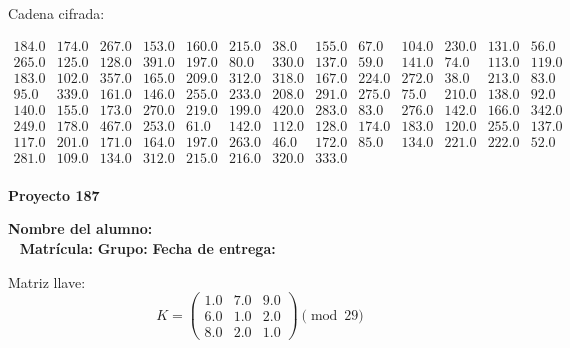 \documentclass[12pt]{article}
\begin{document}
Cadena cifrada:
\begin{center}
$\begin{array}{lllllllllllll}
184.0 & 174.0 & 267.0 & 153.0 & 160.0 & 215.0 & 38.0 & 155.0 & 67.0 & 104.0 & 230.0 & 131.0 & 56.0\\
265.0 & 125.0 & 128.0 & 391.0 & 197.0 & 80.0 & 330.0 & 137.0 & 59.0 & 141.0 & 74.0 & 113.0 & 119.0\\
183.0 & 102.0 & 357.0 & 165.0 & 209.0 & 312.0 & 318.0 & 167.0 & 224.0 & 272.0 & 38.0 & 213.0 & 83.0\\
95.0 & 339.0 & 161.0 & 146.0 & 255.0 & 233.0 & 208.0 & 291.0 & 275.0 & 75.0 & 210.0 & 138.0 & 92.0\\
140.0 & 155.0 & 173.0 & 270.0 & 219.0 & 199.0 & 420.0 & 283.0 & 83.0 & 276.0 & 142.0 & 166.0 & 342.0\\
249.0 & 178.0 & 467.0 & 253.0 & 61.0 & 142.0 & 112.0 & 128.0 & 174.0 & 183.0 & 120.0 & 255.0 & 137.0\\
117.0 & 201.0 & 171.0 & 164.0 & 197.0 & 263.0 & 46.0 & 172.0 & 85.0 & 134.0 & 221.0 & 222.0 & 52.0\\
281.0 & 109.0 & 134.0 & 312.0 & 215.0 & 216.0 & 320.0 & 333.0\\
\end{array}$
\end{center}

\newpage


\textbf{Proyecto 187}

\textbf{Nombre del alumno:} \underline{\hspace{13cm}}\\\
\vspace{1cm}
\textbf{Matrícula:} \underline{\hspace{4cm}} \hspace{1cm}
\textbf{Grupo:} \underline{\hspace{2cm}}
\textbf{Fecha de entrega:} \underline{\hspace{2cm}}

\medskip

Matriz llave:
\[
K = \begin{pmatrix}
1.0 & 7.0 & 9.0\\
6.0 & 1.0 & 2.0\\
8.0 & 2.0 & 1.0
\end{pmatrix} \pmod{29}
\]
\end{document}

